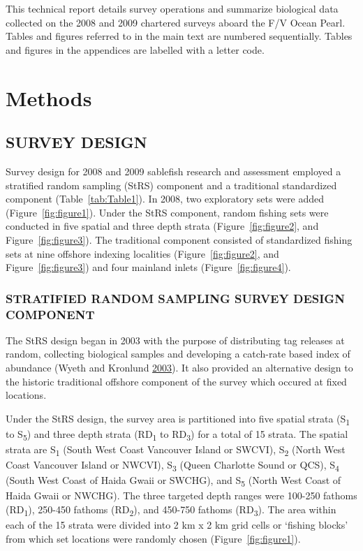 \documentclass[12pt]{article}\usepackage[]{graphicx}\usepackage[]{color}
\begin{document}
This technical report details survey operations and summarize biological data collected on the 2008 and 2009 chartered surveys aboard the F/V Ocean Pearl. Tables and figures referred to in the main text are numbered sequentially. Tables and figures in the appendices are labelled with a letter code.

\hypertarget{methods}{%
\section{Methods}\label{methods}}

\hypertarget{survey-design}{%
\subsection{SURVEY DESIGN}\label{survey-design}}

Survey design for 2008 and 2009 sablefish research and assessment employed a stratified random sampling (StRS) component and a traditional standardized component (Table~\ref{tab:Table1}). In 2008, two exploratory sets were added (Figure~\ref{fig:figure1}). Under the StRS component, random fishing sets were conducted in five spatial and three depth strata (Figure~\ref{fig:figure2}, and Figure~\ref{fig:figure3}). The traditional component consisted of standardized fishing sets at nine offshore indexing localities (Figure~\ref{fig:figure2}, and Figure~\ref{fig:figure3}) and four mainland inlets (Figure~\ref{fig:figure4}).

\hypertarget{stratified-random-sampling-survey-design-component}{%
\subsubsection{STRATIFIED RANDOM SAMPLING SURVEY DESIGN COMPONENT}\label{stratified-random-sampling-survey-design-component}}

The StRS design began in 2003 with the purpose of distributing tag releases at random, collecting biological samples and developing a catch-rate based index of abundance (Wyeth and Kronlund \protect\hyperlink{ref-Wyeth2003}{2003}). It also provided an alternative design to the historic traditional offshore component of the survey which occured at fixed locations.

Under the StRS design, the survey area is partitioned into five spatial strata (S\textsubscript{1} to S\textsubscript{5}) and three depth strata (RD\textsubscript{1} to RD\textsubscript{3}) for a total of 15 strata. The spatial strata are S\textsubscript{1} (South West Coast Vancouver Island or SWCVI), S\textsubscript{2} (North West Coast Vancouver Island or NWCVI), S\textsubscript{3} (Queen Charlotte Sound or QCS), S\textsubscript{4} (South West Coast of Haida Gwaii or SWCHG), and S\textsubscript{5} (North West Coast of Haida Gwaii or NWCHG). The three targeted depth ranges were 100-250 fathoms (RD\textsubscript{1}), 250-450 fathoms (RD\textsubscript{2}), and 450-750 fathoms (RD\textsubscript{3}). The area within each of the 15 strata were divided into 2 km x 2 km grid cells or `fishing blocks' from which set locations were randomly chosen (Figure~\ref{fig:figure1}).
\end{document}
